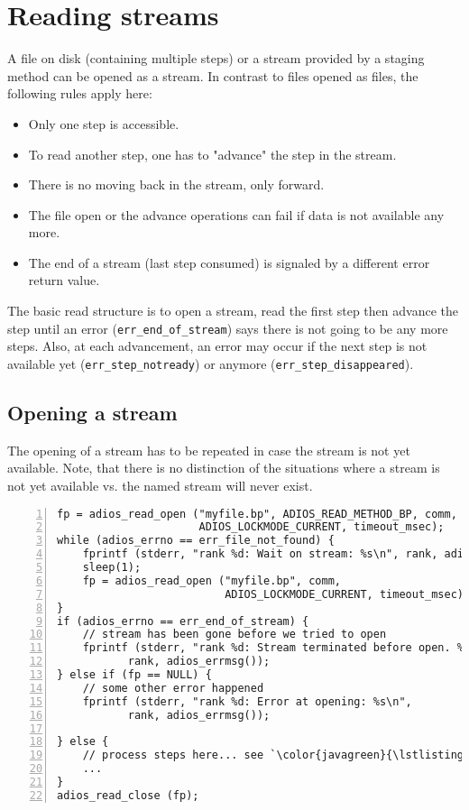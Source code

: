 \section{Reading streams}
A file on disk (containing multiple steps) or a stream provided by a staging method can be opened as a stream. In contrast to files opened as files, the following rules apply here:

  \begin{itemize}
  \item Only one step is accessible.
  \item To read another step, one has to "advance" the step in the stream.
  \item There is no moving back in the stream, only forward.
  \item The file open or the advance operations can fail if data is not available any more.
  \item The end of a stream (last step consumed) is signaled by a different error return value.
  \end{itemize}

The basic read structure is to open a stream, read the first step then advance the step until an error (\verb+err_end_of_stream+) says there is not going to be any more steps. Also, at each advancement, an error may occur if the next step is not available yet (\verb+err_step_notready+) or anymore (\verb+err_step_disappeared+).


\subsection{Opening a stream}
The opening of a stream has to be repeated in case the stream is not yet available. Note, that there is no distinction of the situations where a stream is not yet available vs. the named stream will never exist.

\begin{lstlisting}[numbers=left, numberstyle=\color{gray}, stepnumber=2,
                   caption={While loop to open a stream},  label=code:open_stream]
fp = adios_read_open ("myfile.bp", ADIOS_READ_METHOD_BP, comm, 
                      ADIOS_LOCKMODE_CURRENT, timeout_msec);
while (adios_errno == err_file_not_found) {
    fprintf (stderr, "rank %d: Wait on stream: %s\n", rank, adios_errmsg());
    sleep(1);
    fp = adios_read_open ("myfile.bp", comm, 
                          ADIOS_LOCKMODE_CURRENT, timeout_msec);
}
if (adios_errno == err_end_of_stream) {
    // stream has been gone before we tried to open
    fprintf (stderr, "rank %d: Stream terminated before open. %s\n",
           rank, adios_errmsg());
} else if (fp == NULL) {
    // some other error happened
    fprintf (stderr, "rank %d: Error at opening: %s\n",
           rank, adios_errmsg());

} else {
    // process steps here... see `\color{javagreen}{\lstlistingname~\ref{code:stream_stepbystep}}`
    ...
}
adios_read_close (fp);
\end{lstlisting}


